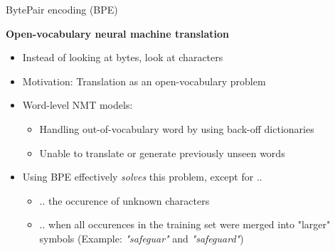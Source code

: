 \begin{vbframe}{BytePair encoding (BPE)}

\vfill

\textbf{Open-vocabulary neural machine translation \href{https://www.aclweb.org/anthology/P16-1162.pdf}{}}
	
	\begin{itemize}
		\item Instead of looking at bytes, look at characters
		\item Motivation: Translation as an open-vocabulary problem
		\item Word-level NMT models:
			\begin{itemize}
				\item Handling out-of-vocabulary word by using back-off dictionaries
				\item Unable to translate or generate previously unseen words
			\end{itemize}
		\item Using BPE effectively \textit{solves} this problem, except for ..
			\begin{itemize}
				\item .. the occurence of unknown characters
				\item .. when all occurences in the training set were merged into "larger" symbols
							(Example: \textit{"safeguar"} and \textit{"safeguard"})
			\end{itemize}
	\end{itemize}

\vfill

\end{vbframe}



